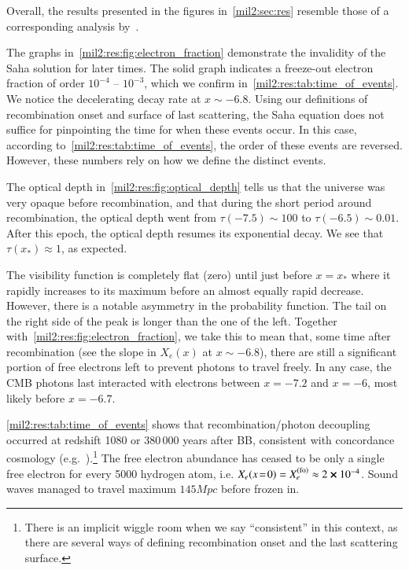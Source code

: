 



Overall, the results presented in the figures in~\cref{mil2:sec:res} resemble those of a corresponding analysis by~\citet[see][Fig.~1,~2]{Callin2006}.


The graphs in~\cref{mil2:res:fig:electron_fraction} demonstrate the invalidity of the Saha solution for later times. The solid graph indicates a freeze-out electron fraction of order $10^{-4}$ -- $10^{-3}$, which we confirm in~\cref{mil2:res:tab:time_of_events}. We notice the decelerating decay rate at $x\sim -6.8$. Using our definitions of recombination onset and surface of last scattering, the Saha equation does not suffice for pinpointing the time for when these events occur. In this case, according to~\cref{mil2:res:tab:time_of_events}, the order of these events are reversed. However, these numbers rely on how we define the distinct events.

The optical depth in~\cref{mil2:res:fig:optical_depth} tells us that the universe was very opaque before recombination, and that during the short period around recombination, the optical depth went from $\tau(-7.5)\sim 100$ to $\tau( -6.5)\sim 0.01$. After this epoch, the optical depth resumes its exponential decay. We see that $\tau(x_*)\approx 1$, as expected. 


The visibility function is completely flat (zero) until just before $x=x_*$ where it rapidly increases to its maximum before an almost equally rapid decrease. However, there is a notable asymmetry in the probability function. The tail on the right side of the peak is longer than the one of the left. Together with~\cref{mil2:res:fig:electron_fraction}, we take this to mean that, some time after recombination (see the slope in $X_e(x)$ at $x\sim -6.8$), there are still a significant portion of free electrons left to prevent photons to travel freely. In any case, the CMB photons last interacted with electrons between $x=-7.2$ and $x=-6$, most likely before $x=-6.7$.

\cref{mil2:res:tab:time_of_events} shows that recombination/photon decoupling occurred at redshift 1080 or 380\,000 years after BB, consistent with concordance cosmology (e.g.~\citet[Tab.~3.1]{Baumann}).\footnote{There is an implicit wiggle room when we say ``consistent'' in this context, as there are several ways of defining recombination onset and the last scattering surface.} The free electron abundance has ceased to be only a single free electron for every 5000 hydrogen atom, i.e. $X_e(x\!=\!0) = X_e^\mathrm{(fo)}\approx 2\cross 10^{-4}$. Sound waves managed to travel maximum $145\unit{Mpc}$ before frozen in.